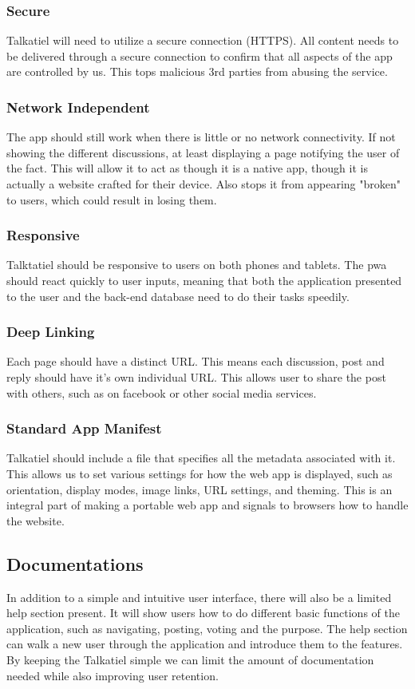 \documentclass[12pt]{article}
\begin{document}
\subsubsection{Secure}
Talkatiel will need to utilize a secure connection (HTTPS).
All content needs to be delivered through a secure connection to confirm that all aspects of the app are controlled by us.  This tops malicious 3rd parties from abusing the service.
\subsubsection{Network Independent}
The app should still work when there is little or no network connectivity.
If not showing the different discussions, at least displaying a page notifying the user of the fact.  This will allow it to act as though it is a native app, though it is actually a website crafted for their device.  Also stops it from appearing "broken" to users, which could result in losing them.
\subsubsection{Responsive}
Talktatiel should be responsive to users on both phones and tablets.  The pwa should react quickly to user inputs, meaning that both the application presented to the user and the back-end database need to do their tasks speedily.
\subsubsection{Deep Linking}
Each page should have a distinct URL.  This means each discussion, post and reply should have it's own individual URL.  This allows user to share the post with others, such as on facebook or other social media services.
\subsubsection{Standard App Manifest}
Talkatiel should include a file that specifies all the metadata associated with it.
This allows us to set various settings for how the web app is displayed, such as orientation, display modes, image links, URL settings, and theming.  This is an integral part of making a portable web app and signals to browsers how to handle the website.
\subsection{Documentations}
In addition to a simple and intuitive user interface, there will also be a limited help section present.  It will show users how to do different basic functions of the application, such as navigating, posting, voting and the purpose.  The help section can walk a new user through the application and introduce them to the features.  By keeping the Talkatiel simple we can limit the amount of documentation needed while also improving user retention.
\end{document}
